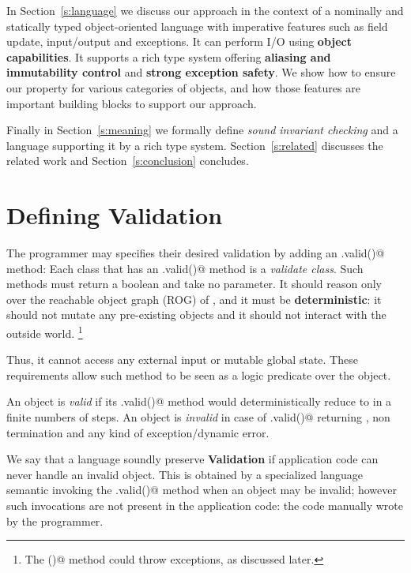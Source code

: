 In Section~\ref{s:language} we discuss our approach in the context of
a nominally and statically typed object-oriented language with
imperative features such as field update, input/output and exceptions.
It can perform I/O using  \textbf{object capabilities}.
It supports a rich type system offering \textbf{aliasing and immutability control} and \textbf{strong exception safety}.
We show how to ensure our property for various categories of objects, and 
how those features are important building blocks to support our approach.

Finally in Section~\ref{s:meaning} we formally define \emph{sound invariant checking} and
a language supporting it by a rich type system.
 Section~\ref{s:related} discusses the related work and Section~\ref{s:conclusion} concludes.



\saveSpace\saveSpace
\section{Defining Validation}
\label{s:def}
\saveSpace
The programmer may specifies their desired validation by adding an \Q@.valid()@ method:
Each class that has an \Q@.valid()@ method is a
\emph{validate class}.
Such \Q@valid@ methods must return a boolean and take no parameter.
It should reason only over the reachable object graph (ROG) of \Q@this@, and
it must be \textbf{deterministic}:
it should not mutate any pre-existing objects and it should not interact with the outside world.%
\footnote{The \Q@valid()@ method could throw exceptions, as discussed later.}

Thus, it cannot access any external input or mutable global state.
These requirements allow such method to be seen as a logic predicate over the object.

An object is \textit{valid} if its \Q@.valid()@ method
would deterministically reduce to \Q@true@ in a finite numbers of steps.
An object is \textit{invalid} in case of \Q@.valid()@ returning \Q@false@,
non termination and any kind of exception/dynamic error.

We say that a language soundly preserve \textbf{Validation} if
application code can never handle an invalid object.
This is obtained by a specialized language semantic invoking the \Q@.valid()@
method when an object may be invalid; however such invocations are not present in
the application code: the code manually wrote by the programmer.


